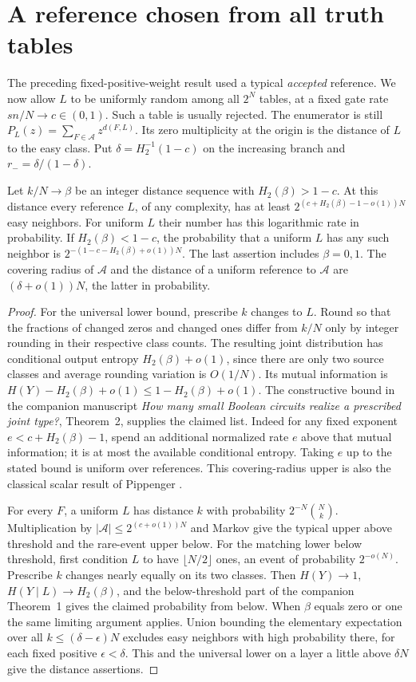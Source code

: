 \section{A reference chosen from all truth tables}
The preceding fixed-positive-weight result used a typical \emph{accepted} reference. We now allow $L$ to be uniformly random among all $2^N$ tables, at a fixed gate rate $sn/N\to c\in(0,1)$. Such a table is usually rejected. The enumerator is still $P_L(z)=\sum_{F\in\mathcal A}z^{d(F,L)}$. Its zero multiplicity at the origin is the distance of $L$ to the easy class. Put $\delta=H_2^{-1}(1-c)$ on the increasing branch and $r_-=\delta/(1-\delta)$.

\begin{theorem}
Let $k/N\to\beta$ be an integer distance sequence with $H_2(\beta)>1-c$. At this distance every reference $L$, of any complexity, has at least $2^{(c+H_2(\beta)-1-o(1))N}$ easy neighbors. For uniform $L$ their number has this logarithmic rate in probability. If $H_2(\beta)<1-c$, the probability that a uniform $L$ has any such neighbor is $2^{-(1-c-H_2(\beta)+o(1))N}$. The last assertion includes $\beta=0,1$. The covering radius of $\mathcal A$ and the distance of a uniform reference to $\mathcal A$ are $(\delta+o(1))N$, the latter in probability.
\end{theorem}
\begin{proof}
For the universal lower bound, prescribe $k$ changes to $L$. Round so that the fractions of changed zeros and changed ones differ from $k/N$ only by integer rounding in their respective class counts. The resulting joint distribution has conditional output entropy $H_2(\beta)+o(1)$, since there are only two source classes and average rounding variation is $O(1/N)$. Its mutual information is $H(Y)-H_2(\beta)+o(1)\le1-H_2(\beta)+o(1)$. The constructive bound in the companion manuscript \emph{How many small Boolean circuits realize a prescribed joint type?}, Theorem~2, supplies the claimed list. Indeed for any fixed exponent $e<c+H_2(\beta)-1$, spend an additional normalized rate $e$ above that mutual information; it is at most the available conditional entropy. Taking $e$ up to the stated bound is uniform over references. This covering-radius upper is also the classical scalar result of Pippenger \cite{pipp}.

For every $F$, a uniform $L$ has distance $k$ with probability $2^{-N}\binom Nk$. Multiplication by $|\mathcal A|\le2^{(c+o(1))N}$ and Markov give the typical upper above threshold and the rare-event upper below. For the matching lower below threshold, first condition $L$ to have $\lfloor N/2\rfloor$ ones, an event of probability $2^{-o(N)}$. Prescribe $k$ changes nearly equally on its two classes. Then $H(Y)\to1$, $H(Y\mid L)\to H_2(\beta)$, and the below-threshold part of the companion Theorem~1 gives the claimed probability from below. When $\beta$ equals zero or one the same limiting argument applies. Union bounding the elementary expectation over all $k\le(\delta-\epsilon)N$ excludes easy neighbors with high probability there, for each fixed positive $\epsilon<\delta$. This and the universal lower on a layer a little above $\delta N$ give the distance assertions.
\end{proof}

